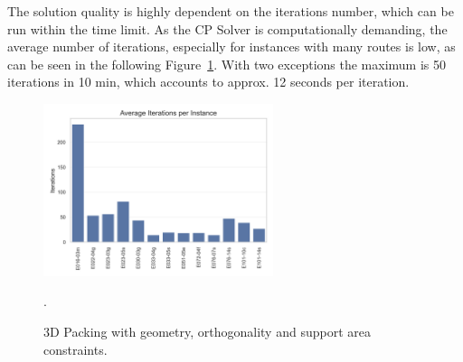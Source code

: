 The solution quality is highly dependent on the iterations number, which can be run within the time limit.
As the \gls{CP} Solver is computationally demanding, the average number of iterations, especially for instances
with many routes is low, as can be seen in the following Figure~\ref{fig:average_iterations_base_parameterstudy}.
With two exceptions the maximum is 50 iterations in 10 min, which accounts to approx. 12 seconds per iteration.

\begin{figure}[ht]
    \centering
    \includegraphics[width=0.6\textwidth]{pictures/parameter_study/iterations_per_instance.png}
    \caption[Visualized 3D packing with packing constraints.]{3D Packing with geometry, orthogonality and support area constraints.}.
    \label{fig:average_iterations_base_parameterstudy}
\end{figure}

